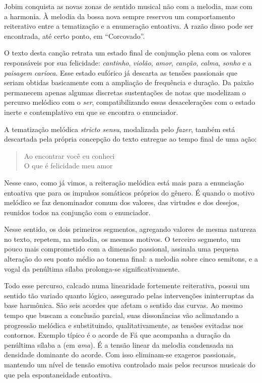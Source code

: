 Jobim conquista as novas zonas de sentido musical não com a melodia, mas
com a harmonia. À melodia da bossa nova sempre reservou um comportamento
reiterativo entre a tematização e a enumeração entoativa. A razão disso
pode ser encontrada, até certo ponto, em ``Corcovado''.

O texto desta canção retrata um estado final de conjunção plena com os
valores responsáveis por sua felicidade: \textit{cantinho}, \textit{violão}, \textit{amor},
\textit{canção}, \textit{calma}, \textit{sonho} e a \textit{paisagem carioca}. Esse estado eufórico já
descarta as tensões passionais que seriam obtidas basicamente com a
ampliação de frequência e duração. Da paixão permanecem apenas algumas
discretas sustentações de notas que modelizam o percurso melódico com o
\textit{ser}, compatibilizando essas desacelerações com o estado inerte e
contemplativo em que se encontra o enunciador.

A tematização melódica \textit{stricto sensu}, modalizada pelo \textit{fazer}, também
está descartada pela própria concepção do texto entregue ao tempo final
de uma ação:

\begin{verse}
Ao encontrar você eu conheci\\
O que é felicidade meu amor
\end{verse}

Nesse caso, como já vimos, a reiteração melódica está mais para a
enunciação entoativa que para os impulsos somáticos próprios do gênero.
É quando o motivo melódico se faz denominador comum dos valores, das
virtudes e dos desejos, reunidos todos na conjunção com o enunciador.

Nesse sentido, os dois primeiros segmentos, agregando valores de mesma
natureza no texto, repetem, na melodia, os mesmos motivos. O terceiro
segmento, um pouco mais comprometido com a dimensão passional, assinala
uma pequena alteração do seu ponto médio ao tonema final: a melodia
sobre cinco semitons, e a vogal da penúltima sílaba prolonga-se
significativamente.


Todo esse percurso, calcado numa linearidade fortemente reiterativa,
possui um sentido tão variado quanto lógico, assegurado pelas
intervenções ininterruptas da base harmônica. São seis acordes que
afetam o sentido das curvas. Ao mesmo tempo que buscam a conclusão
parcial, suas dissonâncias vão aclimatando a progressão melódica e
substituindo, qualitativamente, as tensões evitadas nos contornos.
Exemplo típico é o acorde de Fá que acompanha a duração da penúltima
sílaba a (em \textit{ama}). É a tensão linear da melodia condensada na
densidade dominante do acorde. Com isso eliminam-se exageros passionais,
mantendo um nível de tensão emotiva controlado mais pelos recursos
musicais do que pela espontaneidade entoativa.

